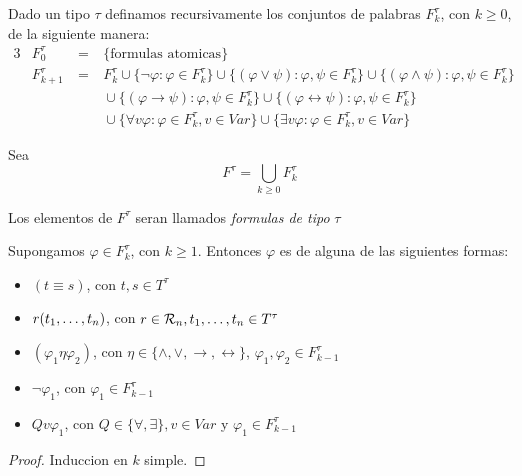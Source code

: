 \begin{definition}
  Dado un tipo $\tau$ definamos recursivamente los conjuntos de palabras $F_k^\tau$, con $k \geq 0$, de la siguiente manera:
  \begin{alignat*}{3}
    &F_0^\tau &\ =&\ \{\text{formulas atomicas}\}\\
    &F_{k+1}^\tau &\ =&\ F_k^\tau \cup \{\neg\varphi: \varphi \in F_k^\tau\} \cup \{(\varphi \lor \psi): \varphi, \psi \in F_k^\tau\} \cup \{(\varphi \land \psi): \varphi, \psi \in F_k^\tau\}\\
    &&\ &\ \cup \{(\varphi \rightarrow \psi): \varphi, \psi \in F_k^\tau\} \cup \{(\varphi \leftrightarrow \psi): \varphi, \psi \in F_k^\tau\}\\
    &&\ &\ \cup \{\forall v\varphi: \varphi \in F_k^\tau, v \in Var\} \cup \{\exists v\varphi: \varphi \in F_k^\tau, v \in Var\}
  \end{alignat*}

  Sea 
  $$
  F^\tau = \bigcup_{k \geq 0} F_k^\tau
  $$

  Los elementos de $F^\tau$ seran llamados \emph{formulas de tipo} $\tau$
\end{definition}

\begin{lemma}
  Supongamos $\varphi \in F_k^\tau$, con $k \geq 1$. Entonces $\varphi$ es de alguna de las siguientes formas:
  \begin{itemize}
    \item $(t\equiv s)$, con $t, s \in T^\tau$
    \item $r(t_{1}, \dots, t_{n})$, con $r \in \mathcal{R}_n, t_{1}, \dots, t_{n} \in T^\tau$
    \item $(\varphi_1 \eta \varphi_2)$, con $\eta \in \{\land, \lor, \rightarrow, \leftrightarrow\}$, $\varphi_1, \varphi_2 \in F_{k-1}^\tau$
    \item $\neg\varphi_1$, con $\varphi_1 \in F_{k-1}^\tau$
    \item $Qv\varphi_1$, con $Q \in \{\forall, \exists\}, v \in Var$ y $\varphi_1 \in F_{k-1}^\tau$
  \end{itemize}
\end{lemma}
\begin{proof}
  Induccion en $k$ simple.
\end{proof}

